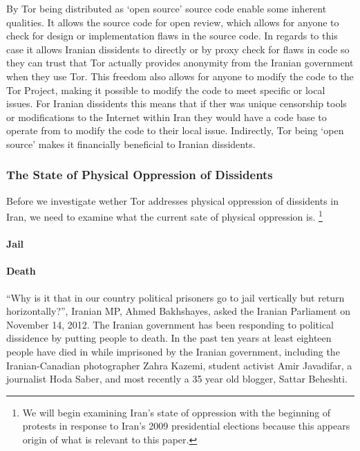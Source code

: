 \documentclass[11pt]{article}
\begin{document}
\begin{multicols}{2}
By Tor being distributed as `open source' source code enable some inherent
qualities. It allows the source code for open review, which allows for anyone to
check for design or implementation flaws in the source code. In regards to this
case it allows Iranian dissidents to directly or by proxy check for flaws in
code so they can trust that Tor actually provides anonymity from the Iranian
government when they use Tor. This freedom also allows for anyone to modify the
code to the Tor Project, making it possible to modify the code to meet specific
or local issues. For Iranian dissidents this means that if ther was unique
censorship tools or modifications to the Internet within Iran they would have a
code base to operate from to modify the code to their local issue.  Indirectly,
Tor being `open source' makes it financially beneficial to Iranian dissidents.

\subsubsection{The State of Physical Oppression of Dissidents}
Before we investigate wether Tor addresses physical oppression of dissidents in
Iran, we need to examine what the current sate of physical oppression is.
\footnote{We will begin examining Iran's state of oppression with the beginning
of protests in response to Iran's 2009 presidential elections because this
appears origin of what is relevant to this paper.}

\paragraph{Jail}


\paragraph{Death}

``Why is it that in our country political prisoners go to jail vertically but return
horizontally?'', Iranian MP, Ahmed Bakhshayes, asked the Iranian Parliament on
November 14, 2012.\cite{IranBloggersDeath} The Iranian government has been
responding to political dissidence by putting people to death. In the past ten
years at least eighteen people have died in while imprisoned by the Iranian
government, including the Iranian-Canadian photographer Zahra Kazemi, student
activist Amir Javadifar, a journalist Hoda Saber, and most recently a 35 year
old blogger, Sattar Beheshti. \cite{IranBloggersDeath}


\end{multicols}
\end{document}
